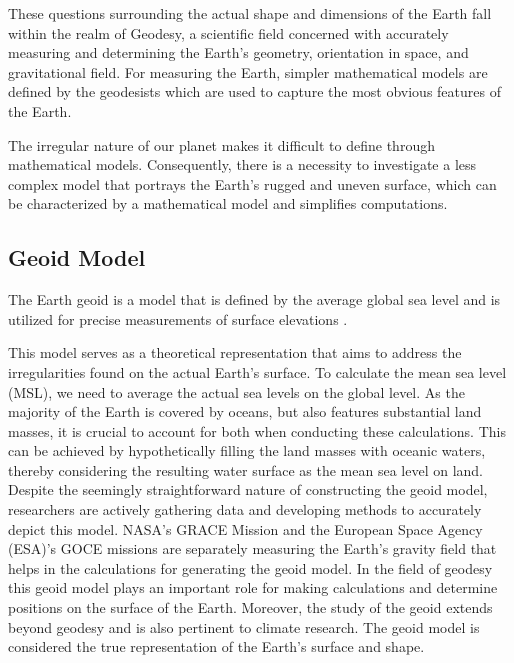 These questions surrounding the actual shape and dimensions of the Earth fall within the realm of Geodesy, a scientific field concerned with accurately measuring and
determining the Earth's geometry, orientation in space, and gravitational field.
For measuring the Earth, simpler mathematical models are defined by the geodesists which are used to capture the most obvious features of the Earth\cite{GEODESY}.

The irregular nature of our planet makes it difficult to define through mathematical models.
Consequently, there is a necessity to investigate a less complex model that portrays the Earth's rugged and uneven surface, which can be characterized by a mathematical
model and simplifies computations.

\subsection{Geoid Model}
The Earth geoid is a model that is defined by the average global sea level and is utilized for precise measurements of surface elevations \cite{NOAA_GEOID}.

This model serves as a theoretical representation that aims to address the irregularities found on the actual Earth's surface. To calculate the mean sea level (MSL),
we need to average the actual sea levels on the global level.
As the majority of the Earth is covered by oceans, but also features substantial land masses, it is crucial to account for both when conducting these calculations.
This can be achieved by hypothetically filling the land masses with oceanic waters, thereby considering the resulting water surface as the mean sea level on land. Despite the seemingly straightforward nature of constructing the geoid model, researchers are actively gathering data and developing methods to accurately depict this model.
NASA's GRACE Mission and the European Space Agency (ESA)'s GOCE missions are separately measuring the Earth's gravity field that helps in the calculations for generating the geoid model.
In the field of geodesy this geoid model plays an important role for making calculations and determine positions on the surface of the Earth. Moreover, the study of the geoid extends beyond geodesy and is also pertinent to climate research\cite{GISGEO_GEOID}. The geoid model is considered the true representation of the Earth's surface and shape.

